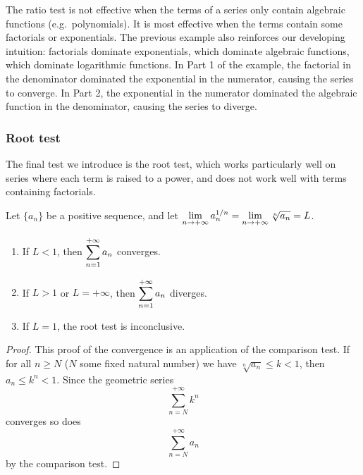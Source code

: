 The ratio test is not effective when the terms of a series only contain algebraic functions (e.g.\, polynomials). It is most effective when the terms contain some factorials or exponentials. The previous example also reinforces our developing intuition: factorials dominate exponentials, which dominate algebraic functions, which dominate logarithmic functions. In Part 1 of the example, the factorial in the denominator dominated the exponential in the numerator, causing the series to converge. In Part 2, the exponential in the numerator dominated the algebraic function in the denominator, causing the series to diverge.

\subsubsection{Root test}
The final test we introduce is the root test, which works particularly well on series where each term is raised to a power, and does not work well with terms containing factorials. %

\begin{theorem}\label{thm:root_test}
Let $\{a_n\}$ be a positive sequence, %
and let $\displaystyle \lim_{n\to+\infty} a_n^{1/n}= \lim_{n\to+\infty} \sqrt[n]{a_n} = L$.
		\begin{enumerate}
			\item If $L<1$, then $\displaystyle\sum_{n=1}^{+\infty} a_n$ converges.
			\item	If $L>1$ or $L=+\infty$, then $\displaystyle\sum_{n=1}^{+\infty} a_n$ diverges.
			\item If $L=1$, the root test is inconclusive.
		\end{enumerate}
\end{theorem}

\ifanalysis

\begin{proof}
This proof of the convergence is an application of the comparison test. If for all $n \geq N$ ($N$ some fixed natural number) we have $\displaystyle {\sqrt[{n}]{a_{n}}}\leq k<1$, then $a_{n}\leq k^{n}<1$. Since the geometric series $$\displaystyle \sum _{n=N}^{+\infty }k^{n}$$
converges so does 
$$\displaystyle \sum _{n=N}^{+\infty} a_{n}$$
by the comparison test.
\end{proof}



